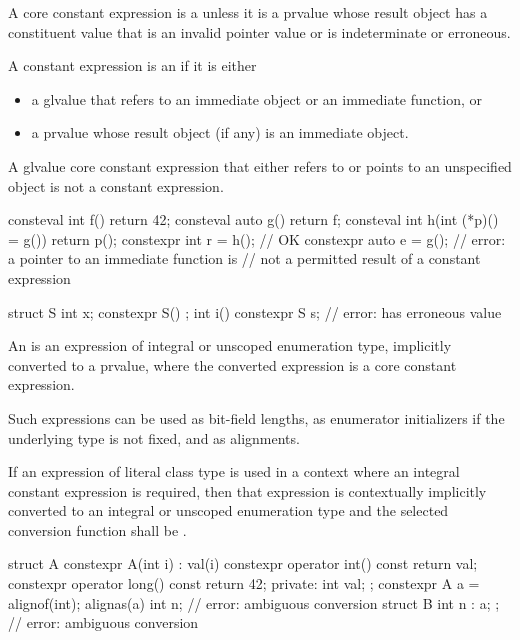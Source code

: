 \pnum
A core constant expression
is a 
unless it is a prvalue whose result object
has a constituent value that is an invalid pointer value
or is indeterminate or erroneous.

\pnum
A constant expression is an 
if it is either
\begin{itemize}
\item
a glvalue that refers to an immediate object or an immediate function, or
\item
a prvalue whose result object (if any) is an immediate object.
\end{itemize}
\begin{note}
A glvalue core constant expression
that either refers to or points to an unspecified object
is not a constant expression.
\end{note}
\begin{example}
\begin{codeblock}
consteval int f() { return 42; }
consteval auto g() { return f; }
consteval int h(int (*p)() = g()) { return p(); }
constexpr int r = h();                          // OK
constexpr auto e = g();                         // error: a pointer to an immediate function is
                                                // not a permitted result of a constant expression

struct S {
  int x;
  constexpr S() {}
};
int i() {
  constexpr S s;                                // error:  has erroneous value
}
\end{codeblock}
\end{example}

\pnum
An 
is an expression of integral or
unscoped enumeration type, implicitly converted to a prvalue, where the converted expression is a core constant expression.
\begin{note}
Such expressions can be
used as bit-field lengths, as enumerator
initializers if the underlying type is not fixed,
and as alignments.
\end{note}

\pnum
If an expression of literal class type is used in a context where an
integral constant expression is required, then that expression is
contextually implicitly converted to an integral or unscoped
enumeration type
and the selected conversion function shall be .
\begin{example}
\begin{codeblock}
struct A {
  constexpr A(int i) : val(i) { }
  constexpr operator int() const { return val; }
  constexpr operator long() const { return 42; }
private:
  int val;
};
constexpr A a = alignof(int);
alignas(a) int n;               // error: ambiguous conversion
struct B { int n : a; };        // error: ambiguous conversion
\end{codeblock}
\end{example}

